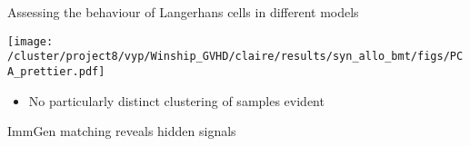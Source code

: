 \documentclass[final,hyperref={pdfpagelabels=false}]{beamer}
\begin{document}
\begin{frame}{}
\begin{columns}[t]
\begin{column}{.36\linewidth}
\begin{block}{Assessing the behaviour of Langerhans cells in different models}

%



  \begin{minipage}{0.4\textwidth}
   \texttt{[image: /cluster/project8/vyp/Winship\_GVHD/claire/results/syn\_allo\_bmt/figs/PCA\_prettier.pdf]}
      \end{minipage}
  \begin{minipage}{0.4\textwidth}
      {\small          \begin{itemize}
    \item No particularly distinct clustering of samples evident
          \end{itemize}}
  \end{minipage}
\end{block}

\begin{block}{ImmGen matching reveals hidden signals}


\end{block}
\end{column}
\end{columns}
\end{frame}
\end{document}
